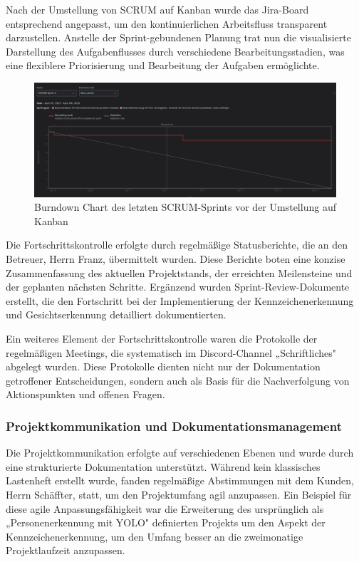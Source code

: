Nach der Umstellung von SCRUM auf Kanban wurde das Jira-Board entsprechend angepasst, um den kontinuierlichen Arbeitsfluss transparent darzustellen. Anstelle der Sprint-gebundenen Planung trat nun die visualisierte Darstellung des Aufgabenflusses durch verschiedene Bearbeitungsstadien, was eine flexiblere Priorisierung und Bearbeitung der Aufgaben ermöglichte.

\begin{figure}[h]
    \centering
    \includegraphics[width=1.0\textwidth]{data/burndown.png}
    \caption{Burndown Chart des letzten SCRUM-Sprints vor der Umstellung auf Kanban}
    \label{fig:burndown}
\end{figure}

Die Fortschrittskontrolle erfolgte durch regelmäßige Statusberichte, die an den Betreuer, Herrn Franz, übermittelt wurden. Diese Berichte boten eine konzise Zusammenfassung des aktuellen Projektstands, der erreichten Meilensteine und der geplanten nächsten Schritte. Ergänzend wurden Sprint-Review-Dokumente erstellt, die den Fortschritt bei der Implementierung der Kennzeichenerkennung und Gesichtserkennung detailliert dokumentierten.

Ein weiteres Element der Fortschrittskontrolle waren die Protokolle der regelmäßigen Meetings, die systematisch im Discord-Channel „Schriftliches" abgelegt wurden. Diese Protokolle dienten nicht nur der Dokumentation getroffener Entscheidungen, sondern auch als Basis für die Nachverfolgung von Aktionspunkten und offenen Fragen.

\subsubsection{Projektkommunikation und Dokumentationsmanagement}

Die Projektkommunikation erfolgte auf verschiedenen Ebenen und wurde durch eine strukturierte Dokumentation unterstützt. Während kein klassisches Lastenheft erstellt wurde, fanden regelmäßige Abstimmungen mit dem Kunden, Herrn Schäffter, statt, um den Projektumfang agil anzupassen. Ein Beispiel für diese agile Anpassungsfähigkeit war die Erweiterung des ursprünglich als „Personenerkennung mit YOLO" definierten Projekts um den Aspekt der Kennzeichenerkennung, um den Umfang besser an die zweimonatige Projektlaufzeit anzupassen.

